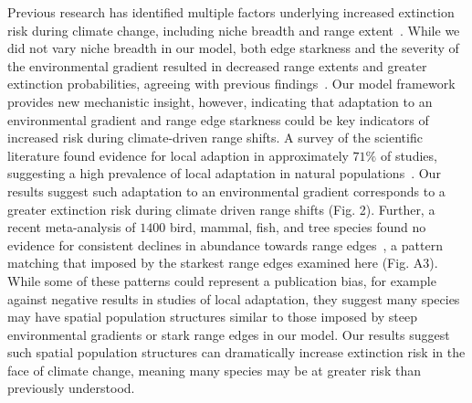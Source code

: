 \documentclass[11pt]{article}
\begin{document}
Previous research has identified multiple factors underlying increased extinction risk during climate change, including niche breadth and range extent~\citep{thuiller2005niche, schwartz2006predicting}. While we did not vary niche breadth in our model, both edge starkness and the severity of the environmental gradient resulted in decreased range extents and greater extinction probabilities, agreeing with previous findings~\citep{schwartz2006predicting}. Our model framework provides new mechanistic insight, however, indicating that adaptation to an environmental gradient and range edge starkness could be key indicators of increased risk during climate-driven range shifts. A survey of the scientific literature found evidence for local adaption in approximately $71\%$ of studies, suggesting a high prevalence of local adaptation in natural populations~\citep{hereford2009quantitative}. Our results suggest such adaptation to an environmental gradient corresponds to a greater extinction risk during climate driven range shifts (Fig. 2).  Further, a recent meta-analysis of $1400$ bird, mammal, fish, and tree species found no evidence for consistent declines in abundance towards range edges~\citep{dallas2017species}, a pattern matching that imposed by the starkest range edges examined here (Fig. A3). While some of these patterns could represent a publication bias, for example against negative results in studies of local adaptation, they suggest many species may have spatial population structures similar to those imposed by steep environmental gradients or stark range edges in our model. Our results suggest such spatial population structures can dramatically increase extinction risk in the face of climate change, meaning many species may be at greater risk than previously understood.
\end{document}

